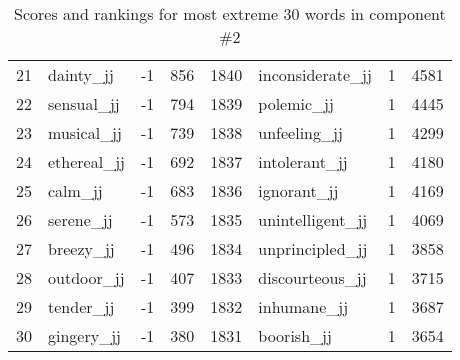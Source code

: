 \begin{table}[tbp]
\begin{tabular}{| rlr@{.}l | rlr@{.}l |}
    21 & dainty\_jj & -1 & 856    &    1840 & inconsiderate\_jj & 1 & 4581 \\
    22 & sensual\_jj & -1 & 794    &    1839 & polemic\_jj & 1 & 4445 \\
    23 & musical\_jj & -1 & 739    &    1838 & unfeeling\_jj & 1 & 4299 \\
    24 & ethereal\_jj & -1 & 692    &    1837 & intolerant\_jj & 1 & 4180 \\
    25 & calm\_jj & -1 & 683    &    1836 & ignorant\_jj & 1 & 4169 \\
    26 & serene\_jj & -1 & 573    &    1835 & unintelligent\_jj & 1 & 4069 \\
    27 & breezy\_jj & -1 & 496    &    1834 & unprincipled\_jj & 1 & 3858 \\
    28 & outdoor\_jj & -1 & 407    &    1833 & discourteous\_jj & 1 & 3715 \\
    29 & tender\_jj & -1 & 399    &    1832 & inhumane\_jj & 1 & 3687 \\
    30 & gingery\_jj & -1 & 380    &    1831 & boorish\_jj & 1 & 3654 \\
    \hline
    \end{tabular}
    \caption{Scores and rankings for most extreme 30 words in component \#2} 
\end{table}
\clearpage
